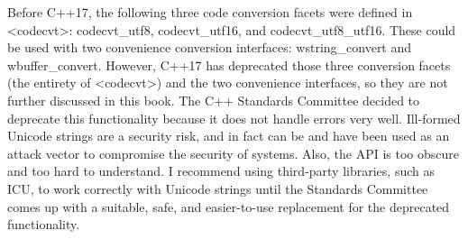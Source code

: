 Before C++17, the following three code conversion facets were defined in <codecvt>: codecvt\_utf8, codecvt\_utf16, and codecvt\_utf8\_utf16. These could be used with two convenience conversion interfaces: wstring\_convert and wbuffer\_convert. However, C++17 has deprecated those three conversion facets (the entirety of <codecvt>) and the two convenience interfaces, so they are not further discussed in this book. The C++ Standards Committee decided to deprecate this functionality because it does not handle errors very well. Ill-formed Unicode strings are a security risk, and in fact can be and have been used as an attack vector to compromise the security of systems. Also, the API is too obscure and too hard to understand. I recommend using third-party libraries, such as ICU, to work correctly with Unicode strings until the Standards Committee comes up with a suitable, safe, and easier-to-use replacement for the deprecated functionality.














